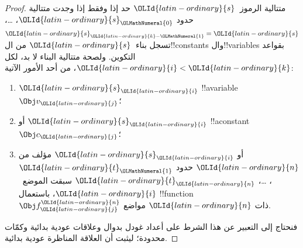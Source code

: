 \documentclass[../../../include/open-logic-section]{subfiles}
\begin{document}
\begin{proof}
متتالية الرموز~${\OLId{latin-ordinary}{s}}$ حد إذا وفقط إذا وجدت
متتالية حدود ${\OLId{latin-ordinary}{s}}_{\OLMathNumeral{0}}$، \dots، ${\OLId{latin-ordinary}{s}}_{{\OLId{latin-ordinary}{k}}-{\OLMathNumeral{1}}}={\OLId{latin-ordinary}{s}}$
تسجل بناء~${\OLId{latin-ordinary}{s}}$ من ال!!{constant}s
وال!!{variable}s بقواعد التكوين.
ولصحة متتالية البناء لا بد، لكل ${\OLId{latin-ordinary}{i}}<{\OLId{latin-ordinary}{k}}$،
من أحد الأمور الآتية:
\begin{enumerate}
\item ${\OLId{latin-ordinary}{s}}_{\OLId{latin-ordinary}{i}}$ !!a{variable}~$\Obj v_{\OLId{latin-ordinary}{j}}$؛
\item أو ${\OLId{latin-ordinary}{s}}_{\OLId{latin-ordinary}{i}}$ !!a{constant}~$\Obj c_{\OLId{latin-ordinary}{j}}$؛
\item أو ${\OLId{latin-ordinary}{s}}_{\OLId{latin-ordinary}{i}}$ مؤلف من ${\OLId{latin-ordinary}{n}}$ حدود
  ${\OLId{latin-ordinary}{t}}_{\OLMathNumeral{1}}$، \dots، ${\OLId{latin-ordinary}{t}}_{\OLId{latin-ordinary}{n}}$ سبقت الموضع~${\OLId{latin-ordinary}{i}}$،
  باستعمال !!{function}~$\Obj f^{\OLId{latin-ordinary}{n}}_{\OLId{latin-ordinary}{j}}$ ذات ${\OLId{latin-ordinary}{n}}$ مواضع.
\end{enumerate}
فنحتاج إلى التعبير عن هذا الشرط على أعداد غودل
بدوال وعلاقات عودية بدائية وكمّات محدودة؛
ليثبت أن العلاقة المناظرة عودية بدائية.


\end{proof}
\end{document}
